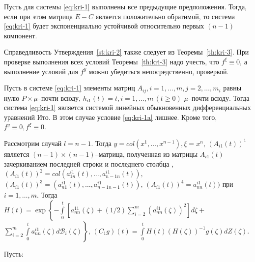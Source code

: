 \begin{statement}\label{st:kri-2}
    Пусть для системы \eqref{eq:kri-1} выполнены все
    предыдущие предположения. Тогда, если при этом матрица $\bar E - C$
    является положительно обратимой, то система \eqref{eq:kri-1} будет
    экспоненциально устойчивой относительно первых $(n-1)$ компонент.
\end{statement}

Справедливость Утверждения~\ref{st:kri-2} также следует из Теоремы~\ref{th:kri-3}. При
проверке выполнения всех условий Теоремы~\ref{th:kri-3}  надо учесть, что $f^\xi
\equiv 0$, а выполнение условий для $f^y $ можно убедиться
непосредственно, проверкой.

Пусть в системе \eqref{eq:kri-1} элементы матриц $A_{ij}, i = 1, \dots, m, j = 2,
\dots, m_i$ равны нулю $P\times\mu$--почти всюду,   $h_{i1}(t) = t, i
= 1, \dots, m \, (t \geq 0)$ $\mu $--почти всюду. Тогда система \eqref{eq:kri-1}
является системой линейных обыкновенных дифференциальных уравнений
Ито. В этом случае условие \eqref{eq:kri-1a} лишнее. Кроме того, $f^y \equiv 0,
f^\xi \equiv 0$.

Рассмотрим случай  $l = n-1$. Тогда $y = col(x^1,\dots,x^{n-1}), \xi =
x^n$, $(A_{i1}(t))^1$ является $(n-1)\times (n-1)$--матрица,
полученная из матрицы $A_{i1}(t)$ зачеркиванием последней строки и
последнего столбца , $(A_{i1}(t))^2 =
col(a^{i1}_{1n}(t),...,a^{i1}_{n-1 n}(t))$, $(A_{i1}(t))^3 =
(a^{i1}_{n1}(t),\dots,a^{i1}_{n-1n-1}(t))$, $(A_{i1}(t))^4 =
a^{i1}_{nn}(t))$ при $i = 1,\dots,m $. Тогда $H(t) = \exp \left
\{-\int \limits _{0}^t [a^{11}_{nn}(\zeta) + (1/2)\sum \limits
_{i=2}^m (a^{i1}_{nn}(\zeta))^2]d\zeta  + \right .$ $\left . \sum
\limits_{i=2}^m \int \limits
 _0^t a^{i1}_{nn}(\zeta)d\mathcal B_i(\zeta)\right \}$, $(C_1g)(t) = \int \limits
_{0}^tH(t)(H(\zeta))^{-1}g(\zeta)dZ(\zeta)$.

Пусть:


